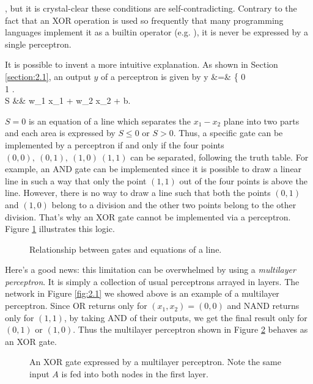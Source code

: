 \documentclass{article}
\theoremstyle{definition}
\newcommand{\sect}[1]{Section \ref{section:#1}}
\newcommand{\fig}[1]{Figure \ref{fig:#1}}
\begin{document}
, but it is crystal-clear these conditions are self-contradicting. Contrary to the fact that an XOR operation is used so frequently that many programming languages implement it as a builtin operator (e.g. \inline{\textasciicircum}), it is never be expressed by a single perceptron.

\newpage

It is possible to invent a more intuitive explanation. As shown in \sect{2.1}, an output $y$ of a perceptron is given by
\begineq
y &=& \left\{  0  \\ 1  \edarray \right.  \\
S &\equiv& w_1 x_1 + w_2 x_2 + b. 
\edeq

$S = 0$ is an equation of a line which separates the $x_1 - x_2$ plane into two parts and each area is expressed by $S \leq 0$ or $S > 0$. Thus, a specific gate can be implemented by a perceptron if and only if the four points $(0,0),\ (0,1),\ (1,0)\ (1,1)$ can be separated, following the truth table. For example, an AND gate can be implemented since it is possible to draw a linear line in such a way that only the point $(1, 1)$ out of the four points is above the line. However, there is no way to draw a line such that both the points $(0, 1)$ and $(1, 0)$ belong to a division and the other two points belong to the other division. That's why an XOR gate cannot be implemented via a perceptron. \fig{2.2} illustrates this logic.

\begin{figure}[H]
    \centering
    \begin{subfigure}[H]{1.0\textwidth}
	\end{subfigure}
    \caption{Relationship between gates and equations of a line.}
    \label{fig:2.2}
\end{figure}

Here's a good news: this limitation can be overwhelmed by using a {\it multilayer perceptron}. It is simply a collection of usual perceptrons arrayed in layers. The network in \fig{2.1} we showed above is an example of a multilayer perceptron. Since OR returns  only for $(x_1, x_2) = (0, 0)$ and NAND returns  only for $(1, 1)$, by taking AND of their outputs, we get the final result  only for $(0,1)$ or $(1, 0)$. Thus the multilayer perceptron shown in \fig{2.3} behaves as an XOR gate.

\begin{figure}[H]
    \centering
    \begin{subfigure}[H]{1.0\textwidth}
	\end{subfigure}
    \caption{An XOR gate expressed by a multilayer perceptron. Note the same input $A$ is fed into both nodes in the first layer.}
    \label{fig:2.3}
\end{figure}
\end{document}
